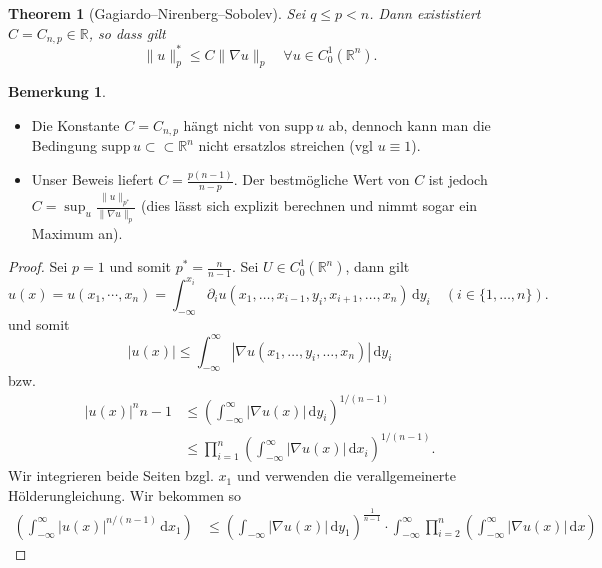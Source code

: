 \documentclass[
paper=a4,
bibtotocnumbered,
liststotocnumbered,
tablecaptionabove,
pointlessnumbers,
twoside,
openright,
10pt
]
{report}
\newcommand{\supp}{\mathrm{supp}\,}
\newtheorem{thm}{Theorem}[chapter]
\theoremstyle{definition}
\newtheorem*{rem}{Bemerkung}
\numberwithin{equation}{chapter}
\begin{document}
\begin{thm}[Gagiardo--Nirenberg--Sobolev]
	Sei $q\le p <n$. Dann exististiert $C=C_{n,p}\in \mathbb R$, so dass gilt
	\begin{equation}
	\|u\|_p^* \le C \| \nabla u\|_p \quad \forall u \in C_0^1(\mathbb R^n).
	\end{equation}
\end{thm}
\begin{rem}
 \begin{itemize}
	\item Die Konstante $C= C_{n,p}$ hängt nicht von $\supp u$ ab, dennoch kann man die Bedingung $\supp u\subset \subset \mathbb R^n$ nicht ersatzlos streichen (vgl $u\equiv 1$).
	\item Unser Beweis liefert $C= \frac{p(n-1)}{n-p}$. Der bestmögliche Wert von $C$ ist jedoch  $C= \sup_u \frac{\|u\|_{p^*}}{\|\nabla u\|_p}$ (dies lässt sich explizit berechnen und nimmt sogar ein Maximum an).
 \end{itemize}
\end{rem}
\begin{proof}
	Sei $p=1$ und somit $p^*= \frac{n}{n-1}$. Sei $U\in C_0^1(\mathbb R^n)$, dann gilt 
	\begin{equation}
		u(x)=u(x_1, \cdots, x_n) = \int_{-\infty}^{x_i} \partial_i u(x_1, \ldots, x_{i-1}, y_i, x_{i+1}, \ldots, x_n) \, \mathrm dy_i \quad (i\in \{1, \ldots, n\}).
	\end{equation}
	und somit 
	\begin{equation}
		|u(x)| \le \int_{-\infty}^\infty | \nabla u(x_1, \ldots, y_i, \ldots, x_n)|\, \mathrm dy_i
	\end{equation}
	bzw.
	\begin{align}
		|u(x)|^{n}{n-1} &\le \left ( \int_{-\infty}^\infty | \nabla u(x)|\, \mathrm dy_i\right ) ^{1/(n-1)}\\
		&\le \prod_{i=1}^n \left ( \int_{-\infty}^\infty |\nabla u(x)|\, \mathrm dx_i \right )^{1/(n-1)}.
	\end{align}
	Wir integrieren beide Seiten bzgl. $x_1$ und verwenden die verallgemeinerte Hölderungleichung. Wir bekommen so
	\begin{align}
		\left ( \int_{-\infty}^\infty | u(x)|^{n/(n-1)} \, \mathrm dx_1 \right ) &\le \left ( \int_{-\infty} |\nabla u(x)|\, \mathrm dy_1 \right )^{\frac{1}{n-1}} \cdot \int_{-\infty}^\infty \prod_{i=2}^n \left ( \int_{-\infty}^\infty | \nabla u(x)| \, \mathrm dx \right )
	\end{align}
\end{proof}
\end{document}
